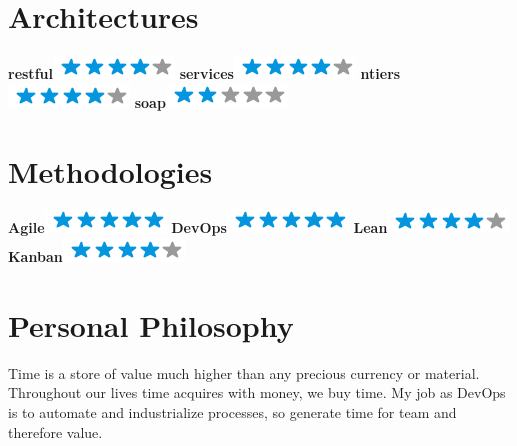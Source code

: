 \documentclass[]{friggeri-cv}
\begin{document}
\begin{aside}
    \section{Architectures}
        \textbf{restful}\includegraphics[scale=0.40]{img/4stars.png}
        \textbf{services}\includegraphics[scale=0.40]{img/4stars.png}
        \textbf{ntiers}\includegraphics[scale=0.40]{img/4stars.png}
        \textbf{soap}\includegraphics[scale=0.40]{img/2stars.png}
        ~
    \section{Methodologies}
        \textbf{Agile}\includegraphics[scale=0.40]{img/5stars.png}
        \textbf{DevOps}\includegraphics[scale=0.40]{img/5stars.png}
        \textbf{Lean}\includegraphics[scale=0.40]{img/4stars.png}
        \textbf{Kanban}\includegraphics[scale=0.40]{img/4stars.png}
        ~
\end{aside}

\section{Personal Philosophy}
    Time is a store of value much higher than any precious currency or
    material. Throughout our lives time acquires with money, we buy time.
    My job as DevOps is to automate and industrialize processes,
    so generate time for team and therefore value.
\end{document}
